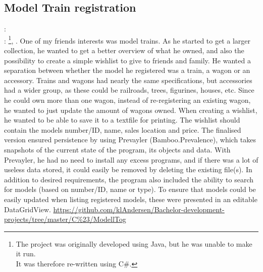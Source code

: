 \subsection{Model Train registration}
\label{sec:model_train}
:  \\	
: \footnote{
	The project was originally developed using Java, but he was unable to make it run. \\
	It was therefore re-written using C\#.
}, . 
\vspace{0.5em}\newline
One of my friends interests was model trains. 
As he started to get a larger collection, he wanted to get a better overview of what he owned, and also the possibility to create a simple wishlist to give to friends and family.
\vspace{0.5em}\newline
He wanted a separation between whether the model he registered was a train, a wagon or an accessory.
Trains and wagons had nearly the same specifications, but accessories had a wider group, as these could be railroads, trees, figurines, houses, etc.
Since he could own more than one wagon, instead of re-registering an existing wagon, he wanted to just update the amount of wagons owned.
When creating a wishlist, he wanted to be able to save it to a textfile for printing.
The wishlist should contain the models number/ID, name, sales location and price. 
\vspace{0.5em}\newline
The finalised version ensured persistence by using Prevayler (Bamboo.Prevalence), which takes snapshots of the current state of the program, its objects and data.
With Prevayler, he had no need to install any excess programs, and if there was a lot of useless data stored, it could easily be removed by deleting the existing file(s).
In addition to desired requirements, the program also included the ability to search for models (based on number/ID, name or type). 
To ensure that models could be easily updated when listing registered models, these were presented in an editable DataGridView.
\vspace{0.5em}\newline
{} \url{https://github.com/klAndersen/Bachelor-development-projects/tree/master/C%23/ModellTog}

